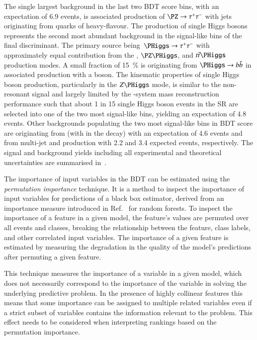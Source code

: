 The single largest background in the last two BDT score bins, with an
expectation of 6.9 events, is associated production of $\PZ \rightarrow \tautau$
with jets originating from quarks of heavy-flavour. The production of single
Higgs bosons represents the second most abundant background in the signal-like
bins of the final discriminant. The primary source
being~$\PHiggs \rightarrow \tautau$ with approximately equal contribution from
the \ggF, $\PZ\PHiggs$, and $\ttbar\PHiggs$ production modes. A small fraction
of \SI{15}{\percent} is originating from $\PHiggs \rightarrow \bbbar$ in
associated production with a \PZ boson. The kinematic properties of single Higgs
boson production, particularly in the $Z\PHiggs$ mode, is similar to the
non-resonant \HH signal and largely limited by the \PHiggs-system mass
reconstruction performance such that about 1 in 15 single Higgs boson events in
the SR are selected into one of the two most signal-like bins, yielding an
expectation of 4.8 events. Other backgrounds populating the two most signal-like
bins in BDT score are originating from \ttbar (with \truetauhadvis in the decay)
with an expectation of 4.6 events and \jettotauhadvis from multi-jet and \ttbar
production with 2.2 and 3.4 expected events, respectively. The signal and
background yields including all experimental and theoretical uncertainties are
summarised in~.

The importance of input variables in the BDT can be estimated using
the \emph{permutation importance} technique. It is a method to inspect
the importance of input variables for predictions of a black box
estimator, derived from an importance measure introduced in
Ref.~\cite{breiman01} for random forests. To inspect the importance of
a feature in a given model, the feature's values are permuted over all
events and classes, breaking the relationship between the feature,
class labels, and other correlated input variables. The importance of
a given feature is estimated by measuring the degradation in the
quality of the model's predictions after permuting a given feature.

This technique measures the importance of a variable in a given model, which
does not necessarily correspond to the importance of the variable in solving the
underlying predictive problem. In the presence of highly collinear features this
means that some importance can be assigned to multiple related variables even if
a strict subset of variables contains the information relevant to the
problem. This effect needs to be considered when interpreting rankings based on
the permutation importance.


